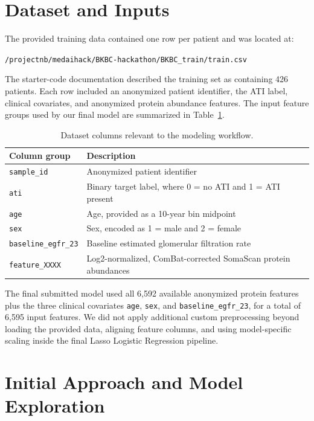 \documentclass[11pt]{article}
\begin{document}
\section{Dataset and Inputs}

The provided training data contained one row per patient and was located at:

\begin{center}
\texttt{/projectnb/medaihack/BKBC-hackathon/BKBC\_train/train.csv}
\end{center}

The starter-code documentation described the training set as containing 426 patients. Each row included an anonymized patient identifier, the ATI label, clinical covariates, and anonymized protein abundance features. The input feature groups used by our final model are summarized in Table~\ref{tab:features}.

\begin{table}[h]
\centering
\begin{tabular}{ll}
\toprule
\textbf{Column group} & \textbf{Description} \\
\midrule
\texttt{sample\_id} & Anonymized patient identifier \\
\texttt{ati} & Binary target label, where 0 = no ATI and 1 = ATI present \\
\texttt{age} & Age, provided as a 10-year bin midpoint \\
\texttt{sex} & Sex, encoded as 1 = male and 2 = female \\
\texttt{baseline\_egfr\_23} & Baseline estimated glomerular filtration rate \\
\texttt{feature\_XXXX} & Log2-normalized, ComBat-corrected SomaScan protein abundances \\
\bottomrule
\end{tabular}
\caption{Dataset columns relevant to the modeling workflow.}
\label{tab:features}
\end{table}


The final submitted model used all 6,592 available anonymized protein features plus the three clinical covariates \texttt{age}, \texttt{sex}, and \texttt{baseline\_egfr\_23}, for a total of 6,595 input features. We did not apply additional custom preprocessing beyond loading the provided data, aligning feature columns, and using model-specific scaling inside the final Lasso Logistic Regression pipeline.

\section{Initial Approach and Model Exploration}
\end{document}
